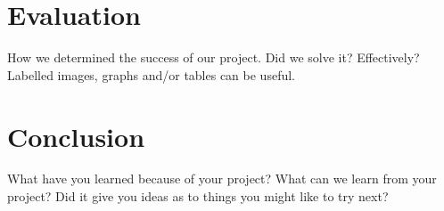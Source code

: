 \documentclass[letterpaper]{article}
\begin{document}
\section{Evaluation}
  How we determined the success of our project. Did we solve it? Effectively?
  Labelled images, graphs and/or tables can be useful.
  
\section{Conclusion}
  What have you learned because of your project? What can we learn from your
  project? Did it give you ideas as to things you might like to try next?

% 
% 
\end{document}
